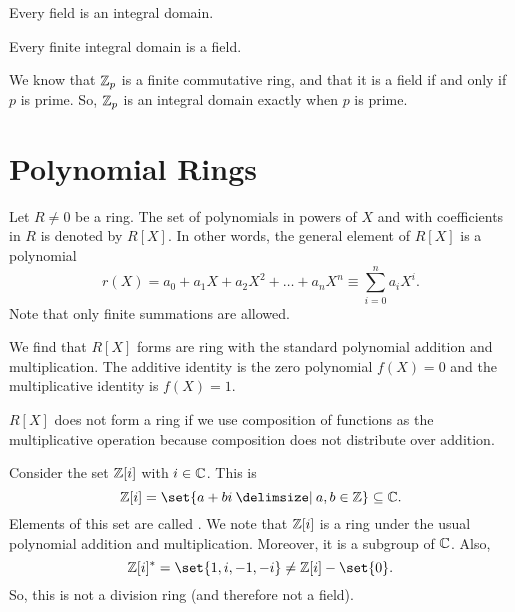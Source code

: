 \documentclass[11pt]{penrose}
\begin{document}
\begin{nthm}
    Every field is an integral domain.
\end{nthm}

\begin{nthm}
    Every finite integral domain is a field.
\end{nthm}

\begin{negg}
    We know that $\mathbb{Z}_p$ is a finite commutative ring, and that it is a field if and only if $p$ is prime. So, $\mathbb{Z}_p$ is an integral domain exactly when $p$ is prime.
\end{negg}

\section{Polynomial Rings}

\begin{negg}
    Let $R \neq 0$ be a ring. The set of polynomials in powers of $X$ and with coefficients in $R$ is denoted by $R[X]$. In other words, the general element of $R[X]$ is a polynomial
    \begin{equation*}
        r(X) = a_0 + a_1 X + a_2 X^2 + \dots + a_n X^n \equiv \sum_{i=0}^n a_i X^i.
    \end{equation*}
    Note that only finite summations are allowed.

    We find that $R[X]$ forms are ring with the standard polynomial addition and multiplication. The additive identity is the zero polynomial $f(X) = 0$ and the multiplicative identity is $f(X) = 1$.

    $R[X]$ does not form a ring if we use composition of functions as the multiplicative operation because composition does not distribute over addition.
\end{negg}

\begin{negg}
    Consider the set $\mathbb{Z}[i]$ with $i \in \mathbb{C}$. This is
    \begin{equation*}
        \Z[i] = \set{a + bi \st a, b \in \Z} \subseteq \C.
    \end{equation*}
    Elements of this set are called . We note that $\mathbb{Z}[i]$ is a ring under the usual polynomial addition and multiplication. Moreover, it is a subgroup of $\mathbb{C}$. Also,
    \begin{equation*}
        \Z[i]^* = \set{1, i, -1, -i} \neq \Z[i] - \set{0}.
    \end{equation*}
    So, this is not a division ring (and therefore not a field).
\end{negg}
\end{document}
